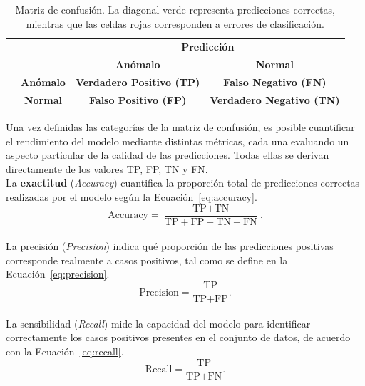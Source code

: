 \documentclass[a4paper,10pt]{book}
\begin{document}
\begin{table}[H]
	\centering
	\renewcommand{\arraystretch}{1.6}
	\setlength{\tabcolsep}{12pt}
	\begin{tabular}{c c c c}
		& & \multicolumn{2}{c}{\textbf{Predicción}} \\[2pt]
		& & \textbf{Anómalo} & \textbf{Normal} \\
		
		\multirow{2}{*}{\rotatebox{90}{\textbf{Real}}}
		& \textbf{Anómalo} &
		\cellcolor{green!20}\textbf{Verdadero Positivo (TP)} &
		\cellcolor{red!20}\textbf{Falso Negativo (FN)} \\[3pt]
		
		& \textbf{Normal} &
		\cellcolor{red!20}\textbf{Falso Positivo (FP)} &
		\cellcolor{green!20}\textbf{Verdadero Negativo (TN)} \\
	\end{tabular}
	\caption{Matriz de confusión. La diagonal verde representa predicciones correctas, mientras que las celdas rojas corresponden a errores de clasificación.}
	\label{tab:mat_conf}
\end{table}

Una vez definidas las categorías de la matriz de confusión, es posible cuantificar el rendimiento del modelo mediante distintas métricas, cada una evaluando un aspecto particular de la calidad de las predicciones. Todas ellas se derivan directamente de los valores TP, FP, TN y FN.\\

La \textbf{exactitud} (\emph{Accuracy}) cuantifica la proporción total de predicciones correctas realizadas por el modelo según la Ecuación~\ref{eq:accuracy}.
\begin{equation}
	\text{Accuracy} =
	\frac{\text{TP} + \text{TN}}
	{\text{TP} + \text{FP} + \text{TN} + \text{FN}}.
	\label{eq:accuracy}
\end{equation}\\

La precisión (\emph{Precision}) indica qué proporción de las predicciones positivas corresponde realmente a casos positivos, tal como se define en la Ecuación~\ref{eq:precision}.
\begin{equation}
	\text{Precision} =
	\frac{\text{TP}}
	{\text{TP} + \text{FP}}.
	\label{eq:precision}
\end{equation}\\

La sensibilidad (\emph{Recall}) mide la capacidad del modelo para identificar correctamente los casos positivos presentes en el conjunto de datos, de acuerdo con la Ecuación~\ref{eq:recall}.
\begin{equation}
	\text{Recall} =
	\frac{\text{TP}}
	{\text{TP} + \text{FN}}.
	\label{eq:recall}
\end{equation}\\
\end{document}
